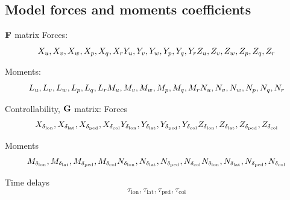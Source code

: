 \subsection{Model forces and moments coefficients}
  $\mathrm{\textbf{F}}$ matrix
  Forces: 
  $$
  X_u, X_v, X_w, X_p, X_q, X_r \\
  Y_u, Y_v, Y_w, Y_p, Y_q, Y_r \\
  Z_u, Z_v, Z_w, Z_p, Z_q, Z_r
  $$

  Moments:
  $$
  L_u, L_v, L_w, L_p, L_q, L_r \\
  M_u, M_v, M_w, M_p, M_q, M_r \\
  N_u, N_v, N_w, N_p, N_q, N_r
  $$

  Controllability, $\mathrm{\textbf{G}}$ matrix:
  Forces
  $$
  X_{\delta_{\mathrm{lon}}}, X_{\delta_{\mathrm{lat}}}, X_{\delta_{\mathrm{ped}}}, X_{\delta_{\mathrm{col}}} \\
  Y_{\delta_{\mathrm{lon}}}, Y_{\delta_{\mathrm{lat}}}, Y_{\delta_{\mathrm{ped}}}, Y_{\delta_{\mathrm{col}}} \\
  Z_{\delta_{\mathrm{lon}}}, Z_{\delta_{\mathrm{lat}}}, Z_{\delta_{\mathrm{ped}}}, Z_{\delta_{\mathrm{col}}}
  $$

  Moments
  $$
  M_{\delta_{\mathrm{lon}}}, M_{\delta_{\mathrm{lat}}}, M_{\delta_{\mathrm{ped}}}, M_{\delta_{\mathrm{col}}} \\
  N_{\delta_{\mathrm{lon}}}, N_{\delta_{\mathrm{lat}}}, N_{\delta_{\mathrm{ped}}}, N_{\delta_{\mathrm{col}}} \\
  N_{\delta_{\mathrm{lon}}}, N_{\delta_{\mathrm{lat}}}, N_{\delta_{\mathrm{ped}}}, N_{\delta_{\mathrm{col}}}
  $$

  Time delays
  $$
  \tau_{\mathrm{lon}}, \tau_{\mathrm{lat}}, \tau_{\mathrm{ped}}, \tau_{\mathrm{col}}
  $$